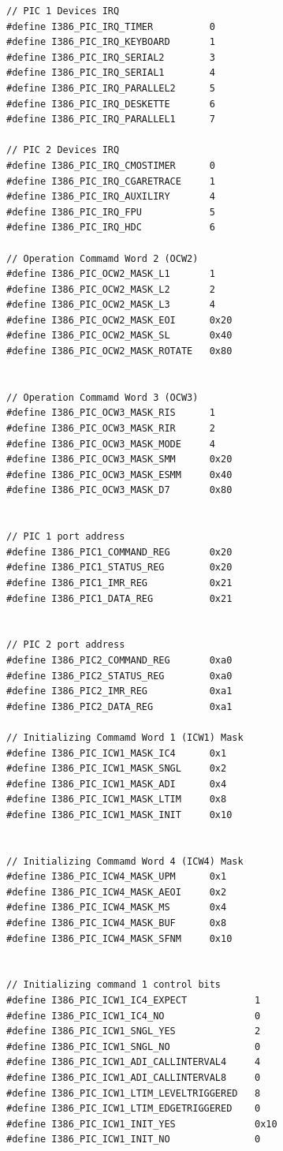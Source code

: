 \documentclass[document.tex]{subfiles}
\begin{document}
\begin{english}

\lstset{numberstyle=\tiny,numbers=left,stepnumber=1,numbersep=5pt,tabsize=2,extendedchars=true,breaklines=true,frame=b,showspaces=false, showtabs=false,xleftmargin=10pt,framexleftmargin=10pt,framexrightmargin=5pt,framexbottommargin=4pt,showstringspaces=false,language=C++}


\begin{lstlisting}[label=lst:pic_interface,caption=\en{hal/pic.h: PIC Interface}]
// PIC 1 Devices IRQ
#define I386_PIC_IRQ_TIMER			0
#define I386_PIC_IRQ_KEYBOARD		1
#define I386_PIC_IRQ_SERIAL2		3
#define I386_PIC_IRQ_SERIAL1		4
#define I386_PIC_IRQ_PARALLEL2		5
#define I386_PIC_IRQ_DESKETTE		6
#define I386_PIC_IRQ_PARALLEL1		7

// PIC 2 Devices IRQ
#define I386_PIC_IRQ_CMOSTIMER		0
#define I386_PIC_IRQ_CGARETRACE		1
#define I386_PIC_IRQ_AUXILIRY		4
#define I386_PIC_IRQ_FPU			5
#define I386_PIC_IRQ_HDC			6

// Operation Commamd Word 2 (OCW2)
#define I386_PIC_OCW2_MASK_L1		1
#define I386_PIC_OCW2_MASK_L2		2
#define I386_PIC_OCW2_MASK_L3		4
#define I386_PIC_OCW2_MASK_EOI		0x20
#define I386_PIC_OCW2_MASK_SL		0x40
#define I386_PIC_OCW2_MASK_ROTATE	0x80


// Operation Commamd Word 3 (OCW3)
#define I386_PIC_OCW3_MASK_RIS		1
#define I386_PIC_OCW3_MASK_RIR		2
#define I386_PIC_OCW3_MASK_MODE		4
#define I386_PIC_OCW3_MASK_SMM		0x20
#define I386_PIC_OCW3_MASK_ESMM		0x40
#define I386_PIC_OCW3_MASK_D7		0x80


// PIC 1 port address
#define I386_PIC1_COMMAND_REG		0x20
#define I386_PIC1_STATUS_REG		0x20
#define I386_PIC1_IMR_REG			0x21
#define I386_PIC1_DATA_REG			0x21


// PIC 2 port address
#define I386_PIC2_COMMAND_REG		0xa0
#define I386_PIC2_STATUS_REG		0xa0
#define I386_PIC2_IMR_REG			0xa1
#define I386_PIC2_DATA_REG			0xa1

// Initializing Commamd Word 1 (ICW1) Mask
#define I386_PIC_ICW1_MASK_IC4		0x1
#define I386_PIC_ICW1_MASK_SNGL		0x2
#define I386_PIC_ICW1_MASK_ADI		0x4
#define I386_PIC_ICW1_MASK_LTIM		0x8
#define I386_PIC_ICW1_MASK_INIT		0x10


// Initializing Commamd Word 4 (ICW4) Mask
#define I386_PIC_ICW4_MASK_UPM		0x1
#define I386_PIC_ICW4_MASK_AEOI		0x2
#define I386_PIC_ICW4_MASK_MS		0x4
#define I386_PIC_ICW4_MASK_BUF		0x8
#define I386_PIC_ICW4_MASK_SFNM		0x10


// Initializing command 1 control bits
#define I386_PIC_ICW1_IC4_EXPECT			1
#define I386_PIC_ICW1_IC4_NO				0
#define I386_PIC_ICW1_SNGL_YES				2
#define I386_PIC_ICW1_SNGL_NO				0
#define I386_PIC_ICW1_ADI_CALLINTERVAL4		4
#define I386_PIC_ICW1_ADI_CALLINTERVAL8		0
#define I386_PIC_ICW1_LTIM_LEVELTRIGGERED	8
#define I386_PIC_ICW1_LTIM_EDGETRIGGERED	0
#define I386_PIC_ICW1_INIT_YES				0x10
#define I386_PIC_ICW1_INIT_NO				0


\end{lstlisting}
\end{english}
\end{document}
